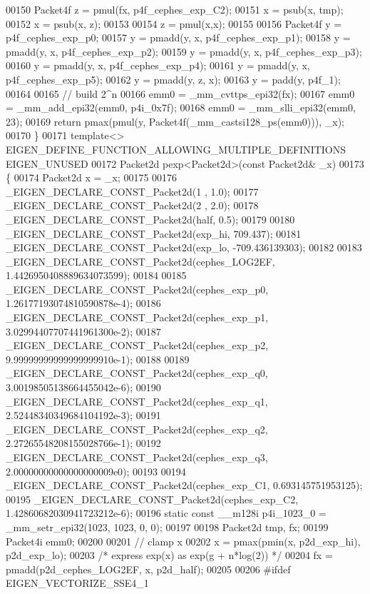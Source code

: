 \begin{DoxyCode}
00150   Packet4f z = pmul(fx, p4f\_cephes\_exp\_C2);
00151   x = psub(x, tmp);
00152   x = psub(x, z);
00153 
00154   z = pmul(x,x);
00155 
00156   Packet4f y = p4f\_cephes\_exp\_p0;
00157   y = pmadd(y, x, p4f\_cephes\_exp\_p1);
00158   y = pmadd(y, x, p4f\_cephes\_exp\_p2);
00159   y = pmadd(y, x, p4f\_cephes\_exp\_p3);
00160   y = pmadd(y, x, p4f\_cephes\_exp\_p4);
00161   y = pmadd(y, x, p4f\_cephes\_exp\_p5);
00162   y = pmadd(y, z, x);
00163   y = padd(y, p4f\_1);
00164 
00165   \textcolor{comment}{// build 2^n}
00166   emm0 = \_mm\_cvttps\_epi32(fx);
00167   emm0 = \_mm\_add\_epi32(emm0, p4i\_0x7f);
00168   emm0 = \_mm\_slli\_epi32(emm0, 23);
00169   \textcolor{keywordflow}{return} pmax(pmul(y, Packet4f(\_mm\_castsi128\_ps(emm0))), \_x);
00170 \}
00171 \textcolor{keyword}{template}<> EIGEN\_DEFINE\_FUNCTION\_ALLOWING\_MULTIPLE\_DEFINITIONS EIGEN\_UNUSED
00172 Packet2d pexp<Packet2d>(\textcolor{keyword}{const} Packet2d& \_x)
00173 \{
00174   Packet2d x = \_x;
00175 
00176   \_EIGEN\_DECLARE\_CONST\_Packet2d(1 , 1.0);
00177   \_EIGEN\_DECLARE\_CONST\_Packet2d(2 , 2.0);
00178   \_EIGEN\_DECLARE\_CONST\_Packet2d(half, 0.5);
00179 
00180   \_EIGEN\_DECLARE\_CONST\_Packet2d(exp\_hi,  709.437);
00181   \_EIGEN\_DECLARE\_CONST\_Packet2d(exp\_lo, -709.436139303);
00182 
00183   \_EIGEN\_DECLARE\_CONST\_Packet2d(cephes\_LOG2EF, 1.4426950408889634073599);
00184 
00185   \_EIGEN\_DECLARE\_CONST\_Packet2d(cephes\_exp\_p0, 1.26177193074810590878e-4);
00186   \_EIGEN\_DECLARE\_CONST\_Packet2d(cephes\_exp\_p1, 3.02994407707441961300e-2);
00187   \_EIGEN\_DECLARE\_CONST\_Packet2d(cephes\_exp\_p2, 9.99999999999999999910e-1);
00188 
00189   \_EIGEN\_DECLARE\_CONST\_Packet2d(cephes\_exp\_q0, 3.00198505138664455042e-6);
00190   \_EIGEN\_DECLARE\_CONST\_Packet2d(cephes\_exp\_q1, 2.52448340349684104192e-3);
00191   \_EIGEN\_DECLARE\_CONST\_Packet2d(cephes\_exp\_q2, 2.27265548208155028766e-1);
00192   \_EIGEN\_DECLARE\_CONST\_Packet2d(cephes\_exp\_q3, 2.00000000000000000009e0);
00193 
00194   \_EIGEN\_DECLARE\_CONST\_Packet2d(cephes\_exp\_C1, 0.693145751953125);
00195   \_EIGEN\_DECLARE\_CONST\_Packet2d(cephes\_exp\_C2, 1.42860682030941723212e-6);
00196   \textcolor{keyword}{static} \textcolor{keyword}{const} \_\_m128i p4i\_1023\_0 = \_mm\_setr\_epi32(1023, 1023, 0, 0);
00197 
00198   Packet2d tmp, fx;
00199   Packet4i emm0;
00200 
00201   \textcolor{comment}{// clamp x}
00202   x = pmax(pmin(x, p2d\_exp\_hi), p2d\_exp\_lo);
00203   \textcolor{comment}{/* express exp(x) as exp(g + n*log(2)) */}
00204   fx = pmadd(p2d\_cephes\_LOG2EF, x, p2d\_half);
00205 
00206 \textcolor{preprocessor}{#ifdef EIGEN\_VECTORIZE\_SSE4\_1}

\end{DoxyCode}
